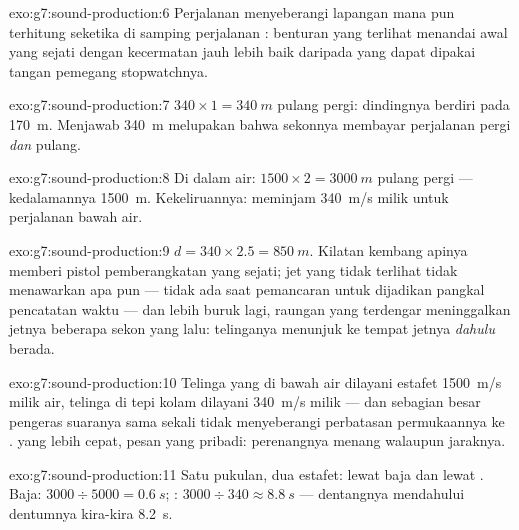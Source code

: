 \begin{solution}{exo:g7:sound-production:6}
Perjalanan  menyeberangi lapangan mana pun terhitung seketika di
samping perjalanan : benturan yang terlihat menandai awal yang
sejati dengan kecermatan jauh lebih baik daripada yang dapat dipakai
tangan pemegang stopwatchnya.
\end{solution}

\begin{solution}{exo:g7:sound-production:7}
$340 \times 1 = \qty{340}{m}$ pulang pergi: dindingnya berdiri pada
\qty{170}{m}. Menjawab \qty{340}{m} melupakan bahwa sekonnya membayar
perjalanan pergi \emph{dan} pulang.
\end{solution}

\begin{solution}{exo:g7:sound-production:8}
Di dalam air: $1500 \times 2 = \qty{3000}{m}$ pulang pergi ---
kedalamannya \qty{1500}{m}. Kekeliruannya: meminjam \qty{340}{m/s}
milik  untuk perjalanan bawah air.
\end{solution}

\begin{solution}{exo:g7:sound-production:9}
$d = 340 \times 2.5 = \qty{850}{m}$. Kilatan kembang apinya memberi
pistol pemberangkatan yang sejati; jet yang tidak terlihat tidak
menawarkan apa pun --- tidak ada saat pemancaran untuk dijadikan
pangkal pencatatan waktu --- dan lebih buruk lagi, raungan yang
terdengar meninggalkan jetnya beberapa sekon yang lalu: telinganya
menunjuk ke tempat jetnya \emph{dahulu} berada.
\end{solution}

\begin{solution}{exo:g7:sound-production:10}
Telinga yang di bawah air dilayani estafet \qty{1500}{m/s} milik air,
telinga di tepi kolam dilayani \qty{340}{m/s} milik  --- dan
sebagian besar  pengeras suaranya sama sekali tidak menyeberangi
perbatasan permukaannya ke .  yang lebih cepat, pesan yang
pribadi: perenangnya menang walaupun jaraknya.
\end{solution}

\begin{solution}{exo:g7:sound-production:11}
Satu pukulan, dua estafet: lewat baja dan lewat . Baja:
$3000 \div 5000 = \qty{0.6}{s}$; : $3000 \div 340 \approx
\qty{8.8}{s}$ --- dentangnya mendahului dentumnya kira-kira
\qty{8.2}{s}.
\end{solution}

